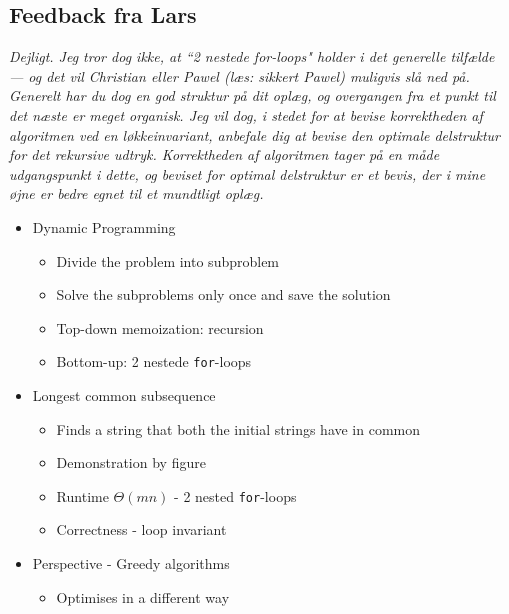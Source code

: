 \subsection*{Feedback fra Lars}
\textit{Dejligt. Jeg tror dog ikke, at “2 nestede for-loops" holder i det
generelle tilfælde — og det vil Christian eller Pawel (læs: sikkert Pawel)
muligvis slå ned på. Generelt har du dog en god struktur på dit oplæg, og
overgangen fra et punkt til det næste er meget organisk. Jeg vil dog, i
stedet for at bevise korrektheden af algoritmen ved en løkkeinvariant,
anbefale dig at bevise den optimale delstruktur for det rekursive udtryk.
Korrektheden af algoritmen tager på en måde udgangspunkt i dette, og
beviset for optimal delstruktur er et bevis, der i mine øjne er bedre
egnet til et mundtligt oplæg.}

\begin{itemize}
    \item Dynamic Programming
    \begin{itemize}
        \item Divide the problem into subproblem
        \item Solve the subproblems only once and save the solution
        \item Top-down memoization: recursion
        \item Bottom-up: 2 nestede \texttt{for}-loops
    \end{itemize}
    \item Longest common subsequence
    \begin{itemize}
        \item Finds a string that both the initial strings have in common
        \item Demonstration by figure
        \item Runtime $\Theta(mn)$ - 2 nested \texttt{for}-loops
        \item Correctness - loop invariant
    \end{itemize}
    \item Perspective - Greedy algorithms
    \begin{itemize}
        \item Optimises in a different way
    \end{itemize}
\end{itemize}
